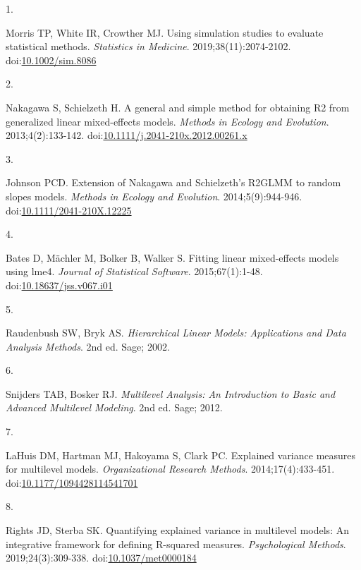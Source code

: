 \documentclass[
  11pt,
]{article}
\newlength{\cslhangindent}
\newlength{\csllabelwidth}
\newenvironment{CSLReferences}[2] %
 {\begin{list}{}{%
  \setlength{\itemindent}{0pt}
  \setlength{\leftmargin}{0pt}
  \setlength{\parsep}{0pt}
  \ifodd #1
   \setlength{\leftmargin}{\cslhangindent}
   \setlength{\itemindent}{-1\cslhangindent}
  \fi
  \setlength{\itemsep}{#2\baselineskip}}}
 {\end{list}}
\newcommand{\CSLLeftMargin}[1]{\parbox[t]{\csllabelwidth}{\strut#1\strut}}
\newcommand{\CSLRightInline}[1]{\parbox[t]{\linewidth - \csllabelwidth}{\strut#1\strut}}
\begin{document}
\protect{}\label{refs}
\begin{CSLReferences}{0}{1}
\CSLLeftMargin{1. }%
\CSLRightInline{Morris TP, White IR, Crowther MJ. Using simulation studies to evaluate statistical methods. \emph{Statistics in Medicine}. 2019;38(11):2074-2102. doi:\href{https://doi.org/10.1002/sim.8086}{10.1002/sim.8086}}

\CSLLeftMargin{2. }%
\CSLRightInline{Nakagawa S, Schielzeth H. A general and simple method for obtaining {R2} from generalized linear mixed-effects models. \emph{Methods in Ecology and Evolution}. 2013;4(2):133-142. doi:\href{https://doi.org/10.1111/j.2041-210x.2012.00261.x}{10.1111/j.2041-210x.2012.00261.x}}

\CSLLeftMargin{3. }%
\CSLRightInline{Johnson PCD. Extension of {Nakagawa} and {Schielzeth}'s {R2GLMM} to random slopes models. \emph{Methods in Ecology and Evolution}. 2014;5(9):944-946. doi:\href{https://doi.org/10.1111/2041-210X.12225}{10.1111/2041-210X.12225}}

\CSLLeftMargin{4. }%
\CSLRightInline{Bates D, Mächler M, Bolker B, Walker S. Fitting linear mixed-effects models using {lme4}. \emph{Journal of Statistical Software}. 2015;67(1):1-48. doi:\href{https://doi.org/10.18637/jss.v067.i01}{10.18637/jss.v067.i01}}

\CSLLeftMargin{5. }%
\CSLRightInline{Raudenbush SW, Bryk AS. \emph{Hierarchical Linear Models: Applications and Data Analysis Methods}. 2nd ed. Sage; 2002.}

\CSLLeftMargin{6. }%
\CSLRightInline{Snijders TAB, Bosker RJ. \emph{Multilevel Analysis: An Introduction to Basic and Advanced Multilevel Modeling}. 2nd ed. Sage; 2012.}

\CSLLeftMargin{7. }%
\CSLRightInline{LaHuis DM, Hartman MJ, Hakoyama S, Clark PC. Explained variance measures for multilevel models. \emph{Organizational Research Methods}. 2014;17(4):433-451. doi:\href{https://doi.org/10.1177/1094428114541701}{10.1177/1094428114541701}}

\CSLLeftMargin{8. }%
\CSLRightInline{Rights JD, Sterba SK. Quantifying explained variance in multilevel models: An integrative framework for defining {R}-squared measures. \emph{Psychological Methods}. 2019;24(3):309-338. doi:\href{https://doi.org/10.1037/met0000184}{10.1037/met0000184}}


\end{CSLReferences}
\end{document}

